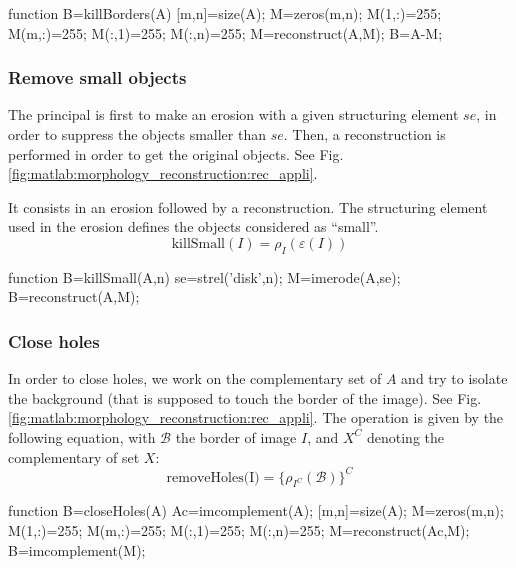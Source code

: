 \begin{matlab}
function B=killBorders(A)
[m,n]=size(A);
M=zeros(m,n);
M(1,:)=255;
M(m,:)=255;
M(:,1)=255;
M(:,n)=255;
M=reconstruct(A,M);
B=A-M;
\end{matlab}

\subsubsection{Remove small objects}
The principal is first to make an erosion with a given structuring element $se$, in order to suppress the objects smaller than $se$. Then, a reconstruction is performed in order to get the original objects. See Fig.\ref{fig:matlab:morphology_reconstruction:rec_appli}. 

It consists in an erosion followed by a reconstruction. The structuring element used in the erosion defines the objects considered as ``small''.
\[\textrm{killSmall}(I)=\rho_I(\varepsilon(I)) \]
\begin{matlab}
function B=killSmall(A,n)
se=strel('disk',n);
M=imerode(A,se);
B=reconstruct(A,M);
\end{matlab}

\subsubsection{Close holes}
In order to close holes, we work on the complementary set of $A$ and try to isolate the background (that is supposed to touch the border of the image). See Fig.\ref{fig:matlab:morphology_reconstruction:rec_appli}. The operation is given by the following equation, with $\mathcal{B}$ the border of image $I$, and $X^C$ denoting the complementary of set $X$:
\[ \textrm{removeHoles(I)} = \{ \rho_{I^C}(\mathcal{B})\}^C\]

\begin{matlab}
function B=closeHoles(A)
Ac=imcomplement(A);
[m,n]=size(A);
M=zeros(m,n);
M(1,:)=255;
M(m,:)=255;
M(:,1)=255;
M(:,n)=255;
M=reconstruct(Ac,M);
B=imcomplement(M);
\end{matlab}


